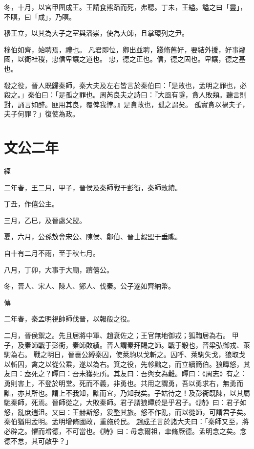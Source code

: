 \documentclass{ctexart}
\begin{document}
冬，十月，以宮甲圍成王。王請食熊蹯而死，弗聽。丁未，王縊。謚之曰「靈」，不瞑，曰「成」，乃瞑。

穆王立，以其為大子之室與潘崇，使為大師，且掌環列之尹。

穆伯如齊，始聘焉，禮也。
凡君即位，卿出並聘，踐脩舊好，要結外援，好事鄰國，以衛社稷，忠信卑讓之道也。
忠，德之正也。信，德之固也。卑讓，德之基也。

殽之役，晉人既歸秦師，秦大夫及左右皆言於秦伯曰：「是敗也，孟明之罪也，必殺之。」秦伯曰：「是孤之罪也。周芮良夫之詩曰：『大風有隧，貪人敗類。聽言則對，誦言如醉。匪用其良，覆俾我悖。』是貪故也，孤之謂矣。
孤實貪以禍夫子，夫子何罪？」復使為政。





\section{文公二年}


經



二年春，王二月，甲子，晉侯及秦師戰于彭衙，秦師敗績。

丁丑，作僖公主。

三月，乙巳，及晉處父盟。

夏，六月，公孫敖會宋公、陳侯、鄭伯、晉士縠盟于垂隴。

自十有二月不雨，至于秋七月。

八月，丁卯，大事于大廟，躋僖公。

冬，晉人、宋人、陳人、鄭人、伐秦。公子遂如齊納幣。

傳



二年春，秦孟明視帥師伐晉，以報殽之役。

二月，晉侯禦之。先且居將中軍、趙衰佐之；王官無地御戎；狐鞫居為右。
甲子，及秦師戰于彭衙，秦師敗績。晉人謂秦拜賜之師。戰于殽也，晉梁弘御戎、萊駒為右。
戰之明日，晉襄公縛秦囚，使萊駒以戈斬之。囚呼、萊駒失戈，狼取戈以斬囚，禽之以從公乘，遂以為右。箕之役，先軫黜之，而立續簡伯。狼瞫怒，其友曰：盍死之？瞫曰：吾未獲死所。其友曰：吾與女為難。瞫曰：《周志》有之：勇則害上，不登於明堂。死而不義，非勇也。共用之謂勇，吾以勇求右，無勇而黜，亦其所也。謂上不我知，黜而宜，乃知我矣。子姑待之！及彭衙既陳，以其屬馳秦師，死焉。晉師從之，大敗秦師。君子謂狼瞫於是乎君子。《詩》曰：君子如怒，亂庶遄沮。又曰：王赫斯怒，爰整其旅。怒不作亂，而以從師，可謂君子矣。秦伯猶用孟明。孟明增脩國政，重施於民。
\underline{趙成子}言於諸大夫曰：「秦師又至，將必辟之。懼而增德，不可當也。《詩》曰：毋念爾祖，聿脩厥德。孟明念之矣。念德不怠，其可敵乎？」
\end{document}
